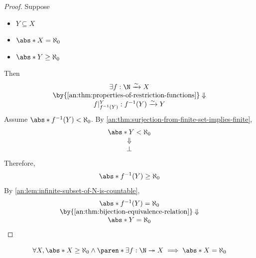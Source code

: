 \begin{proof}
  Suppose
  \begin{itemize}
    \item $Y \subseteq X$
    \item $\abs*{X} = \aleph_{0}$
    \item $\abs*{Y} \geq \aleph_{0}$
  \end{itemize}
  Then
  \[
    \begin{array}{c}
      \exists f: \N \xrightarrow{\sim} X                                \\
      \by{\Cref{an:thm:properties-of-restriction-functions}} \Downarrow \\
      f|_{f^{-1}(Y)}^{Y}: f^{-1}(Y) \xrightarrow{\sim} Y
    \end{array}
  \]
  Assume $\abs*{f^{-1}(Y)} < \aleph_{0}$. By \cref{an:thm:surjection-from-finite-set-implies-finite},
  \[
    \begin{array}{c}
      \abs*{Y} < \aleph_{0} \\
      \Downarrow            \\
      \bot
    \end{array}
  \]
  Therefore,
  \[
    \abs*{f^{-1}(Y)} \geq \aleph_{0}
  \]
  By \cref{an:lem:infinite-subset-of-N-is-countable},
  \[
    \begin{array}{c}
      \abs*{f^{-1}(Y)} = \aleph_{0}                                \\
      \by{\Cref{an:thm:bijection-equivalence-relation}} \Downarrow \\
      \abs*{Y} = \aleph_{0}
    \end{array}
  \]
\end{proof}

\bigskip

\begin{theorem} \label{an:thm:surjection-from-N}
  \[
    \forall X, \abs*{X} \geq \aleph_{0} \land \paren*{\exists f: \N \twoheadrightarrow X}
    \implies \abs*{X} = \aleph_{0}
  \]
\end{theorem}

